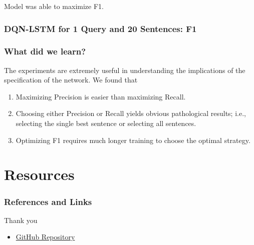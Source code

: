 \documentclass[]{beamer}
\begin{document}
		\begin{frame}
			Model was able to maximize F1.
			\frametitle{DQN-LSTM for 1 Query and 20 Sentences: F1}
			\begin{center}
			\end{center}
		\end{frame}

		\begin{frame}
			\frametitle{What did we learn?}
			The experiments are extremely useful in understanding the implications of the specification of the network. We found that 
			\begin{center}
				\begin{enumerate}
					\item<1-> Maximizing Precision is easier than maximizing Recall.
					\item<1-> Choosing either Precision or Recall yields obvious pathological results; i.e., selecting the single best sentence or selecting all sentences.
					\item<1-> Optimizing F1 requires much longer training to choose the optimal strategy.
				\end{enumerate}
			\end{center}
		\end{frame}




\section{Resources}
\begin{frame}
	\frametitle{References and Links}
	Thank you
	\begin{itemize}
	\item<1-> \color{blue} \href{https://github.com/franciscojavierarceo/DQN-Event-Summarization}{GitHub Repository}
	\end{itemize}
\end{frame}


\end{document}
